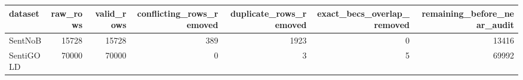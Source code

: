 \begin{tabular}{lrrrrrr}
\toprule
dataset & raw\_rows & valid\_rows & conflicting\_rows\_removed & duplicate\_rows\_removed & exact\_becs\_overlap\_removed & remaining\_before\_near\_audit \\
\midrule
SentNoB & 15728 & 15728 & 389 & 1923 & 0 & 13416 \\
SentiGOLD & 70000 & 70000 & 0 & 3 & 5 & 69992 \\
\bottomrule
\end{tabular}

